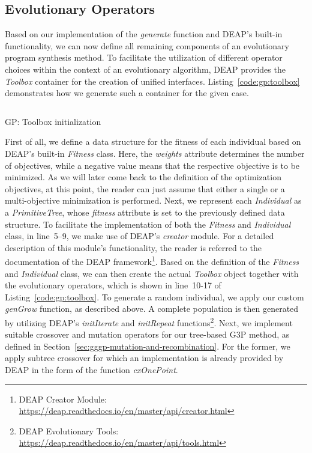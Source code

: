 \subsection{Evolutionary Operators}
Based on our implementation of the \emph{generate} function and DEAP's built-in functionality, we can now define all remaining components of an evolutionary program synthesis method.
To facilitate the utilization of different operator choices within the context of an evolutionary algorithm, DEAP provides the \emph{Toolbox} container for the creation of unified interfaces.
Listing~\ref{code:gp:toolbox} demonstrates how we generate such a container for the given case.
\begin{listing}
	\inputminted[linenos]{python}{evostencils/gp/toolbox.py}
	\caption{GP: Toolbox initialization}
	\label{code:gp:toolbox}
\end{listing}
First of all, we define a data structure for the fitness of each individual based on DEAP's built-in \emph{Fitness} class.
Here, the \emph{weights} attribute determines the number of objectives, while a negative value means that the respective objective is to be minimized.
As we will later come back to the definition of the optimization objectives, at this point, the reader can just assume that either a single or a multi-objective minimization is performed.
Next, we represent each \emph{Individual} as a \emph{PrimitiveTree}, whose \emph{fitness} attribute is set to the previously defined data structure.
To facilitate the implementation of both the \emph{Fitness} and \emph{Individual} class, in line~5--9, we make use of DEAP's \emph{creator} module.
For a detailed description of this module's functionality, the reader is referred to the documentation of the DEAP framework\footnote{DEAP Creator Module: \url{https://deap.readthedocs.io/en/master/api/creator.html}}.
Based on the definition of the \emph{Fitness} and \emph{Individual} class, we can then create the actual \emph{Toolbox} object together with the evolutionary operators, which is shown in line~10-17 of Listing~\ref{code:gp:toolbox}.
To generate a random individual, we apply our custom \emph{genGrow} function, as described above.
A complete population is then generated by utilizing DEAP's \emph{initIterate} and \emph{initRepeat} functions\footnote{DEAP Evolutionary Tools: \url{https://deap.readthedocs.io/en/master/api/tools.html}}.
Next, we implement suitable crossover and mutation operators for our tree-based G3P method, as defined in Section~\ref{sec:gggp-mutation-and-recombination}.
For the former, we apply subtree crossover for which an implementation is already provided by DEAP in the form of the function \emph{cxOnePoint}.
